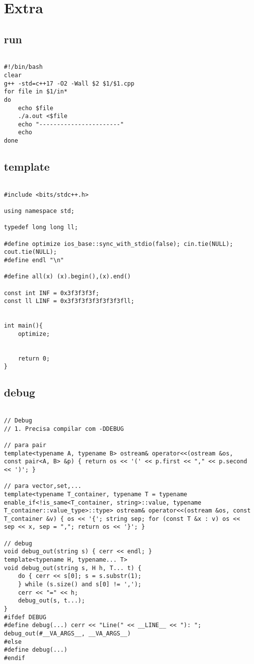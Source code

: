 \documentclass[landscape,twocolumn,10pt,a4paper]{article}
\begin{document}
\section{Extra}
\subsection{run}
\begin{verbatim}

#!/bin/bash
clear
g++ -std=c++17 -O2 -Wall $2 $1/$1.cpp
for file in $1/in*
do
    echo $file
    ./a.out <$file
    echo "-----------------------"
    echo
done\end{verbatim}

\subsection{template}
\begin{verbatim}

#include <bits/stdc++.h>

using namespace std;

typedef long long ll;

#define optimize ios_base::sync_with_stdio(false); cin.tie(NULL); cout.tie(NULL);
#define endl "\n"

#define all(x) (x).begin(),(x).end()

const int INF = 0x3f3f3f3f;
const ll LINF = 0x3f3f3f3f3f3f3f3fll;


int main(){
    optimize;


    return 0;
}\end{verbatim}

\subsection{debug}
\begin{verbatim}

// Debug
// 1. Precisa compilar com -DDEBUG

// para pair
template<typename A, typename B> ostream& operator<<(ostream &os, const pair<A, B> &p) { return os << '(' << p.first << "," << p.second << ')'; }

// para vector,set,...
template<typename T_container, typename T = typename enable_if<!is_same<T_container, string>::value, typename T_container::value_type>::type> ostream& operator<<(ostream &os, const T_container &v) { os << '{'; string sep; for (const T &x : v) os << sep << x, sep = ","; return os << '}'; }

// debug
void debug_out(string s) { cerr << endl; }
template<typename H, typename... T>
void debug_out(string s, H h, T... t) {
    do { cerr << s[0]; s = s.substr(1);
    } while (s.size() and s[0] != ',');
    cerr << "=" << h;
    debug_out(s, t...);
}
#ifdef DEBUG
#define debug(...) cerr << "Line(" << __LINE__ << "): "; debug_out(#__VA_ARGS__, __VA_ARGS__)
#else
#define debug(...)
#endif\end{verbatim}
\end{document}
